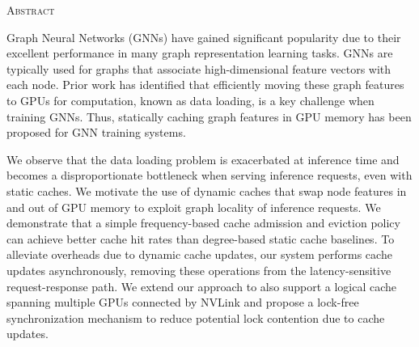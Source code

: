 \begin{center}
  \textsc{Abstract}
\end{center}
%
\noindent
%

Graph Neural Networks (GNNs) have gained significant popularity due to their excellent performance in many graph representation learning tasks. GNNs are typically used for graphs that associate high-dimensional feature vectors with each node. Prior work has identified that efficiently moving these graph features to GPUs for computation, known as data loading, is a key challenge when training GNNs. Thus, statically caching graph features in GPU memory has been proposed for GNN training systems. 

We observe that the data loading problem is exacerbated at inference time and becomes a disproportionate bottleneck when serving inference requests, even with static caches. We motivate the use of dynamic caches that swap node features in and out of GPU memory to exploit graph locality of inference requests. We demonstrate that a simple frequency-based cache admission and eviction policy can achieve better cache hit rates than degree-based static cache baselines. To alleviate overheads due to dynamic cache updates, our system performs cache updates asynchronously, removing these operations from the latency-sensitive request-response path. We extend our approach to also support a logical cache spanning multiple GPUs connected by NVLink and propose a lock-free synchronization mechanism to reduce potential lock contention due to cache updates.
